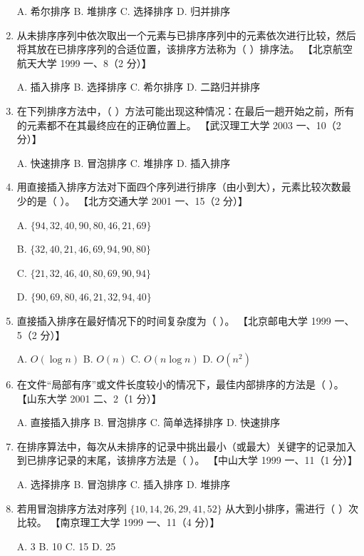 \documentclass[lang=cn,newtx,10pt,scheme=chinese]{../../elegantbook}
\begin{document}
\begin{enumerate}
    A. 希尔排序 \quad B. 堆排序 \quad C. 选择排序 \quad D. 归并排序  

    \item 从未排序序列中依次取出一个元素与已排序序列中的元素依次进行比较，然后将其放在已排序序列的合适位置，该排序方法称为（ ）排序法。  
    【北京航空航天大学 1999 一、8（2 分）】  

    A. 插入排序 \quad B. 选择排序 \quad C. 希尔排序 \quad D. 二路归并排序  

    \item 在下列排序方法中，（ ）方法可能出现这种情况：在最后一趟开始之前，所有的元素都不在其最终应在的正确位置上。  
    【武汉理工大学 2003 一、10（2 分）】  

    A. 快速排序 \quad B. 冒泡排序 \quad C. 堆排序 \quad D. 插入排序  

    \item 用直接插入排序方法对下面四个序列进行排序（由小到大），元素比较次数最少的是（ ）。  
    【北方交通大学 2001 一、15（2 分）】  

    A. $\{94, 32, 40, 90, 80, 46, 21, 69\}$  

    B. $\{32, 40, 21, 46, 69, 94, 90, 80\}$  

    C. $\{21, 32, 46, 40, 80, 69, 90, 94\}$  

    D. $\{90, 69, 80, 46, 21, 32, 94, 40\}$  

    \item 直接插入排序在最好情况下的时间复杂度为（ ）。  
    【北京邮电大学 1999 一、5（2 分）】  

    A. $O(\log n)$ \quad B. $O(n)$ \quad C. $O(n \log n)$ \quad D. $O(n^2)$  

    \item 在文件“局部有序”或文件长度较小的情况下，最佳内部排序的方法是（ ）。  
    【山东大学 2001 二、2（1 分）】  

    A. 直接插入排序 \quad B. 冒泡排序 \quad C. 简单选择排序 \quad D. 快速排序 
    \item 在排序算法中，每次从未排序的记录中挑出最小（或最大）关键字的记录加入到已排序记录的末尾，该排序方法是（ ）。  
    【中山大学 1999 一、11（1 分）】

    A. 选择排序 \quad B. 冒泡排序 \quad C. 插入排序 \quad D. 堆排序  

    \item 若用冒泡排序方法对序列 $\{10, 14, 26, 29, 41, 52\}$ 从大到小排序，需进行（ ）次比较。  
    【南京理工大学 1999 一、11（4 分）】  

    A. 3 \quad B. 10 \quad C. 15 \quad D. 25  


\end{enumerate}
\end{document}
